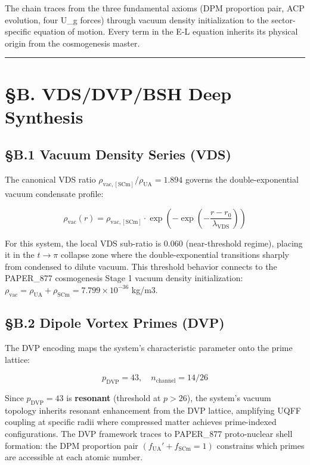 \documentclass[12pt,a4paper]{article}
\begin{document}
The chain traces from the three fundamental axioms (DPM proportion pair, ACP evolution, four U\_g forces) through vacuum density initialization to the sector-specific equation of motion. Every term in the E-L equation inherits its physical origin from the cosmogenesis master.

\medskip\hrule\medskip

\section{\S{}B. VDS/DVP/BSH Deep Synthesis}

\subsection{\S{}B.1 Vacuum Density Series (VDS)}

The canonical VDS ratio $\rho_{\mathrm{vac,[SCm]}} / \rho_{\mathrm{UA}} = 1.894$ governs the double-exponential vacuum condensate profile:

\begin{equation}
\rho_{\mathrm{vac}}(r) = \rho_{\mathrm{vac,[SCm]}} \cdot \exp\!\left(-\exp\!\left(-\frac{r - r_0}{\lambda_{\mathrm{VDS}}}\right)\right)
\end{equation}

For this system, the local VDS sub-ratio is $0.060$ (near-threshold regime), placing it in the $t \to \pi$ collapse zone where the double-exponential transitions sharply from condensed to dilute vacuum. This threshold behavior connects to the PAPER\_877 cosmogenesis Stage 1 vacuum density initialization: $\rho_{\mathrm{vac}} = \rho_{\mathrm{UA}} + \rho_{\mathrm{SCm}} = 7.799 \times 10^{-36}$ kg/m3.

\subsection{\S{}B.2 Dipole Vortex Primes (DVP)}

The DVP encoding maps the system's characteristic parameter onto the prime lattice:

\begin{equation}
p_{\mathrm{DVP}} = 43, \quad n_{\mathrm{channel}} = 14/26
\end{equation}

Since $p_{\mathrm{DVP}} = 43$ is \textbf{resonant} (threshold at $p > 26$), the system's vacuum topology inherits resonant enhancement from the DVP lattice, amplifying UQFF coupling at specific radii where compressed matter achieves prime-indexed configurations. The DVP framework traces to PAPER\_877 proto-nuclear shell formation: the DPM proportion pair $(f_{\mathrm{UA}}' + f_{\mathrm{SCm}} = 1)$ constrains which primes are accessible at each atomic number.
\end{document}
